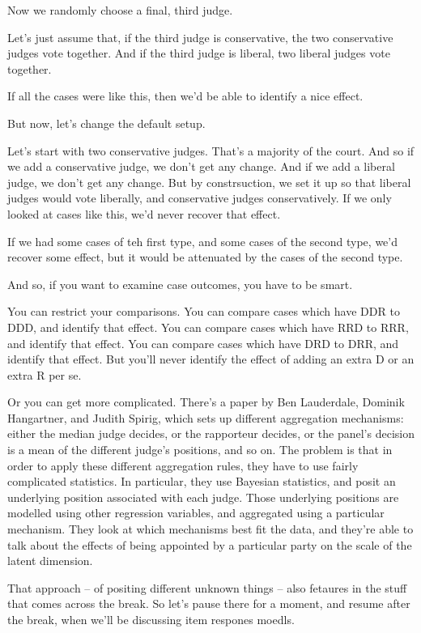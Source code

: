 \documentclass[12pt,twoside]{article}
\begin{document}
Now we randomly choose a final, third judge.

Let's just assume that, if the third judge is conservative, the two
conservative judges vote together. And if the third judge is liberal,
two liberal judges vote together.

If all the cases were like this, then we'd be able to identify a nice
effect.

But now, let's change the default setup.

Let's start with two conservative judges. That's a majority of the
court. And so if we add a conservative judge, we don't get any change.
And if we add a liberal judge, we don't get any change. But by
constrsuction, we set it up so that liberal judges would vote liberally,
and conservative judges conservatively. If we only looked at cases like
this, we'd never recover that effect.

If we had some cases of teh first type, and some cases of the second
type, we'd recover some effect, but it would be attenuated by the cases
of the second type.

And so, if you want to examine case outcomes, you have to be smart.

You can restrict your comparisons. You can compare cases which have DDR
to DDD, and identify that effect. You can compare cases which have RRD
to RRR, and identify that effect. You can compare cases which have DRD
to DRR, and identify that effect. But you'll never identify the effect
of adding an extra D or an extra R per se.

Or you can get more complicated. There's a paper by Ben Lauderdale,
Dominik Hangartner, and Judith Spirig, which sets up different
aggregation mechanisms: either the median judge decides, or the
rapporteur decides, or the panel's decision is a mean of the different
judge's positions, and so on. The problem is that in order to apply
these different aggregation rules, they have to use fairly complicated
statistics. In particular, they use Bayesian statistics, and posit an
underlying position associated with each judge. Those underlying
positions are modelled using other regression variables, and aggregated
using a particular mechanism. They look at which mechanisms best fit the
data, and they're able to talk about the effects of being appointed by a
particular party on the scale of the latent dimension.

That approach -- of positing different unknown things -- also fetaures
in the stuff that comes across the break. So let's pause there for a
moment, and resume after the break, when we'll be discussing item
respones moedls.
\end{document}

